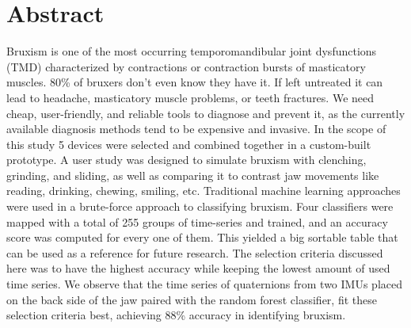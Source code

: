 \chapter*{Abstract}
\label{ch:Abstract}

Bruxism is one of the most occurring temporomandibular joint dysfunctions (TMD) characterized by contractions or contraction bursts of masticatory muscles. 80\% of bruxers don't even know they have it. If left untreated it can lead to headache, masticatory muscle problems, or teeth fractures. We need cheap, user-friendly, and reliable tools to diagnose and prevent it, as the currently available diagnosis methods tend to be expensive and invasive. In the scope of this study 5 devices were selected and combined together in a custom-built prototype. A user study was designed to simulate bruxism with clenching, grinding, and sliding, as well as comparing it to contrast jaw movements like reading, drinking, chewing, smiling, etc. Traditional machine learning approaches were used in a brute-force approach to classifying bruxism. Four classifiers were mapped with a total of 255 groups of time-series and trained, and an accuracy score was computed for every one of them. This yielded a big sortable table that can be used as a reference for future research. The selection criteria discussed here was to have the highest accuracy while keeping the lowest amount of used time series. We observe that the time series of quaternions from two IMUs placed on the back side of the jaw paired with the random forest classifier, fit these selection criteria best, achieving 88\% accuracy in identifying bruxism.